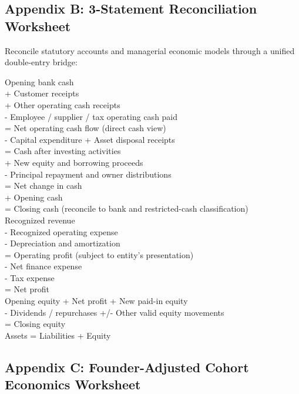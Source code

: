 \subsection{Appendix B: 3-Statement Reconciliation Worksheet}

Reconcile statutory accounts and managerial economic models through a unified double-entry bridge:

\begin{tcolorbox}[colback=BayesCanvas,colframe=BayesDark,arc=1mm,title=\textbf{Appendix B: 3-Statement Reconciliation Worksheet}]
\scriptsize\ttfamily
Opening bank cash\\
+ Customer receipts\\
+ Other operating cash receipts\\
- Employee / supplier / tax operating cash paid\\
= Net operating cash flow (direct cash view)\\
- Capital expenditure + Asset disposal receipts\\
= Cash after investing activities\\
+ New equity and borrowing proceeds\\
- Principal repayment and owner distributions\\
= Net change in cash\\
+ Opening cash\\
= Closing cash (reconcile to bank and restricted-cash classification)\\[1ex]
Recognized revenue\\
- Recognized operating expense\\
- Depreciation and amortization\\
= Operating profit (subject to entity's presentation)\\
- Net finance expense\\
- Tax expense\\
= Net profit\\[1ex]
Opening equity + Net profit + New paid-in equity\\
- Dividends / repurchases +/- Other valid equity movements\\
= Closing equity\\[1ex]
Assets = Liabilities + Equity 
\end{tcolorbox}

\subsection{Appendix C: Founder-Adjusted Cohort Economics Worksheet}


